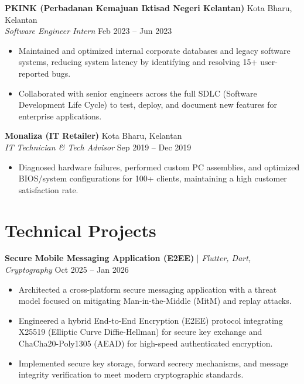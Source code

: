 \documentclass[a4paper,10pt]{article}
\begin{document}
\vspace{0.5em}
\noindent
\textbf{PKINK (Perbadanan Kemajuan Iktisad Negeri Kelantan)} \hfill Kota Bharu, Kelantan \\
\textit{Software Engineer Intern} \hfill Feb 2023 -- Jun 2023
\begin{itemize}[leftmargin=0.2in]
    \item Maintained and optimized internal corporate databases and legacy software systems, reducing system latency by identifying and resolving 15+ user-reported bugs.
    \item Collaborated with senior engineers across the full SDLC (Software Development Life Cycle) to test, deploy, and document new features for enterprise applications.
\end{itemize}

\vspace{0.5em}
\noindent
\textbf{Monaliza (IT Retailer)} \hfill Kota Bharu, Kelantan \\
\textit{IT Technician \& Tech Advisor} \hfill Sep 2019 -- Dec 2019
\begin{itemize}[leftmargin=0.2in]
    \item Diagnosed hardware failures, performed custom PC assemblies, and optimized BIOS/system configurations for 100+ clients, maintaining a high customer satisfaction rate.
\end{itemize}

\section*{Technical Projects}

\noindent
\textbf{Secure Mobile Messaging Application (E2EE)} | \textit{Flutter, Dart, Cryptography} \hfill Oct 2025 -- Jan 2026
\begin{itemize}[leftmargin=0.2in]
    \item Architected a cross-platform secure messaging application with a threat model focused on mitigating Man-in-the-Middle (MitM) and replay attacks.
    \item Engineered a hybrid End-to-End Encryption (E2EE) protocol integrating X25519 (Elliptic Curve Diffie-Hellman) for secure key exchange and ChaCha20-Poly1305 (AEAD) for high-speed authenticated encryption.
    \item Implemented secure key storage, forward secrecy mechanisms, and message integrity verification to meet modern cryptographic standards.
\end{itemize}
\end{document}
